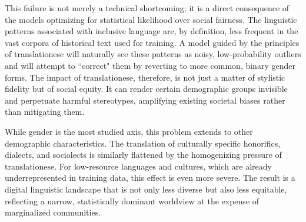 \documentclass[11pt,a4paper]{article}
\begin{document}
This failure is not merely a technical shortcoming; it is a direct consequence of the models optimizing for statistical likelihood over social fairness. The linguistic patterns associated with inclusive language are, by definition, less frequent in the vast corpora of historical text used for training. A model guided by the principles of translationese will naturally see these patterns as noisy, low-probability outliers and will attempt to ``correct" them by reverting to more common, binary gender forms. The impact of translationese, therefore, is not just a matter of stylistic fidelity but of social equity. It can render certain demographic groups invisible and perpetuate harmful stereotypes, amplifying existing societal biases rather than mitigating them.

While gender is the most studied axis, this problem extends to other demographic characteristics. The translation of culturally specific honorifics, dialects, and sociolects is similarly flattened by the homogenizing pressure of translationese. For low-resource languages and cultures, which are already underrepresented in training data, this effect is even more severe. The result is a digital linguistic landscape that is not only less diverse but also less equitable, reflecting a narrow, statistically dominant worldview at the expense of marginalized communities.
\end{document}
